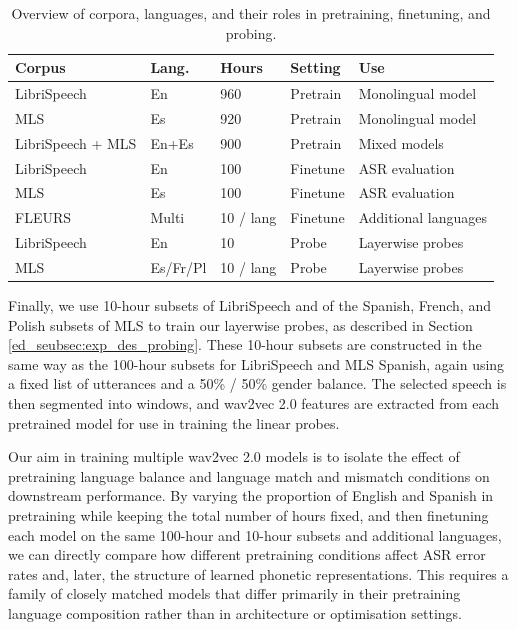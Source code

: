 \begin{table}[b]
    \centering
    \begin{tabular}{l l l l p{4cm}}
        \hline
        Corpus & Lang. & Hours & Setting & Use \\
        \hline
        LibriSpeech & En & 960 & Pretrain & Monolingual model  \\
        MLS & Es & 920 & Pretrain & Monolingual model \\
        LibriSpeech + MLS & En+Es & 900 & Pretrain & Mixed models  \\
        LibriSpeech & En & 100 & Finetune & ASR evaluation \\
        MLS & Es & 100 & Finetune & ASR evaluation \\
        FLEURS & Multi & 10 / lang & Finetune & Additional languages \\
        LibriSpeech & En & 10 & Probe & Layerwise probes \\
        MLS & Es/Fr/Pl & 10 / lang & Probe & Layerwise probes \\
        \hline
    \end{tabular}
    \caption{Overview of corpora, languages, and their roles in pretraining, finetuning, and probing.}
    \label{tab:datasets_overview}
\end{table}

Finally, we use 10-hour subsets of LibriSpeech and of the Spanish, French, and Polish subsets of MLS to train our layerwise probes, as described in Section \ref{ed_seubsec:exp_des_probing}. These 10-hour subsets are constructed in the same way as the 100-hour subsets for LibriSpeech and MLS Spanish, again using a fixed list of utterances and a 50\% / 50\% gender balance. The selected speech is then segmented into windows, and wav2vec 2.0 features are extracted from each pretrained model for use in training the linear probes. 

Our aim in training multiple wav2vec 2.0 models is to isolate the effect of pretraining language balance and language match and mismatch conditions on downstream performance. By varying the proportion of English and Spanish in pretraining while keeping the total number of hours fixed, and then finetuning each model on the same 100-hour and 10-hour subsets and additional languages, we can directly compare how different pretraining conditions affect ASR error rates and, later, the structure of learned phonetic representations. This requires a family of closely matched models that differ primarily in their pretraining language composition rather than in architecture or optimisation settings.



